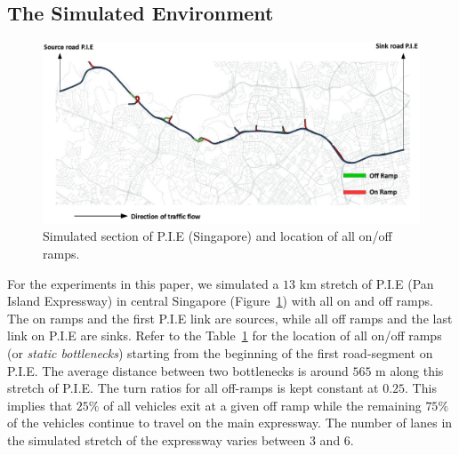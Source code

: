 \documentclass[procedia]{easychair}
\begin{document}
\subsection{The Simulated Environment}
\begin{center}
\begin{figure}[!htbp]
    \centering
    \includegraphics[scale=0.40]{graphs/PIE.jpg}

    \caption{Simulated section of P.I.E (Singapore) and location of all on/off ramps.}
    \label{fig:pie-changi}
  \end{figure}
\end{center}
For the experiments in this paper, we simulated a $13$ km stretch of P.I.E (Pan Island Expressway) in central Singapore (Figure~\ref{fig:pie-changi}) with all on and off ramps. The on ramps and the first P.I.E link are sources, while all off ramps and the last link on P.I.E are sinks. Refer to the Table~\ref{fig:pie-changi} for the location of all on/off ramps (or {\it static bottlenecks}) starting from the beginning of the first road-segment on P.I.E. The average distance between two bottlenecks is around $565$ m along this stretch of P.I.E. The turn ratios for all off-ramps is kept constant at $0.25$. This implies that $25\%$ of all vehicles exit at a given off ramp while the remaining $75\%$ of the vehicles continue to travel on the main expressway. The number of lanes in the simulated stretch of the expressway varies between $3$ and $6$.
\end{document}
